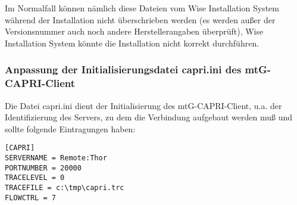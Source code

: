     Im Normalfall können nämlich diese Dateien vom Wise Installation System während der Installation
    nicht überschrieben werden (es werden außer der Versionsnummer auch noch andere Herstellerangaben überprüft),
    Wise Installation System könnte die Installation nicht korrekt durchführen.

\subsubsection{Anpassung der Initialisierungsdatei capri.ini des mtG-CAPRI-Client}
    Die Datei capri.ini dient der Initialisierung des mtG-CAPRI-Client, u.a. der Identifizierung des Servers,
    zu dem die Verbindung aufgebaut werden muß und sollte folgende Eintragungen haben:
\begin{verbatim}
[CAPRI]
SERVERNAME = Remote:Thor
PORTNUMBER = 20000
TRACELEVEL = 0
TRACEFILE = c:\tmp\capri.trc
FLOWCTRL = 7
\end{verbatim}

